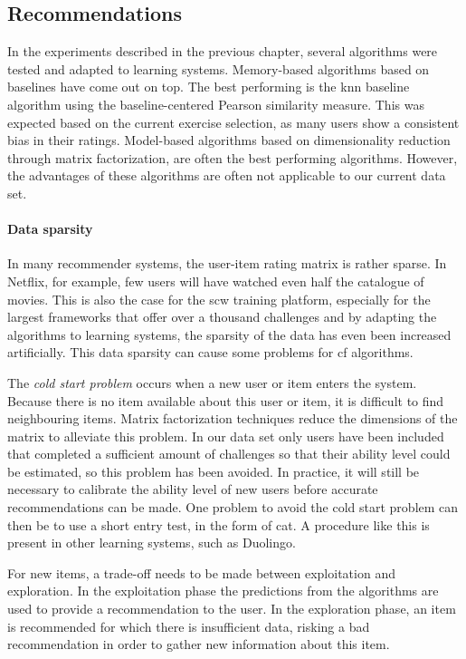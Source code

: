 
\subsection{Recommendations}
In the experiments described in the previous chapter, several algorithms were tested and adapted to learning systems.
Memory-based algorithms based on baselines have come out on top.
The best performing is the \gls{knn} baseline algorithm using the baseline-centered Pearson similarity measure.
This was expected based on the current exercise selection, as many users show a consistent bias in their ratings.
Model-based algorithms based on dimensionality reduction through matrix factorization, are often the best performing algorithms.
However, the advantages of these algorithms are often not applicable to our current data set.

\paragraph{Data sparsity}
In many recommender systems, the user-item rating matrix is rather sparse.
In Netflix, for example, few users will have watched even half the catalogue of movies.
This is also the case for the \gls{scw} training platform, especially for the largest frameworks that offer over a thousand challenges and by adapting the algorithms to learning systems, the sparsity of the data has even been increased artificially.
This data sparsity can cause some problems for \gls{cf} algorithms.

The \emph{cold start problem} occurs when a new user or item enters the system.
Because there is no item available about this user or item, it is difficult to find neighbouring items.
Matrix factorization techniques reduce the dimensions of the matrix to alleviate this problem.
In our data set only users have been included that completed a sufficient amount of challenges so that their ability level could be estimated, so this problem has been avoided.
In practice, it will still be necessary to calibrate the ability level of new users before accurate recommendations can be made.
One problem to avoid the cold start problem can then be to use a short entry test, in the form of \gls{cat}.
A procedure like this is present in other learning systems, such as Duolingo.

For new items, a trade-off needs to be made between exploitation and exploration.
In the exploitation phase the predictions from the algorithms are used to provide a recommendation to the user.
In the exploration phase, an item is recommended for which there is insufficient data, risking a bad recommendation in order to gather new information about this item.

